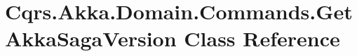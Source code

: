\hypertarget{classCqrs_1_1Akka_1_1Domain_1_1Commands_1_1GetAkkaSagaVersion}{}\section{Cqrs.\+Akka.\+Domain.\+Commands.\+Get\+Akka\+Saga\+Version Class Reference}
\label{classCqrs_1_1Akka_1_1Domain_1_1Commands_1_1GetAkkaSagaVersion}
